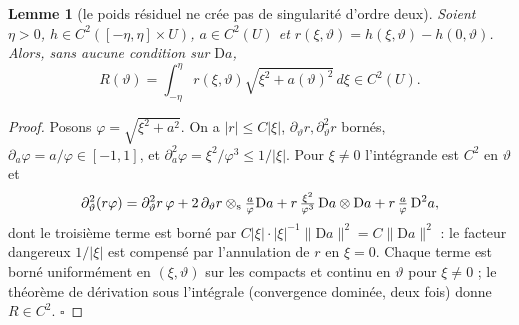 \documentclass[11pt,a4paper]{article}
\newtheorem{lemme}[theoreme]{Lemme}
\theoremstyle{remark}
\newcommand{\vth}{\vartheta}
\newcommand{\D}{\mathrm D}
\begin{document}
\begin{lemme}[le poids résiduel ne crée pas de singularité d'ordre deux]\label{lem:poids}
Soient $\eta>0$, $h\in C^2([-\eta,\eta]\times U)$, $a\in C^2(U)$ et $r(\xi,\vth)=h(\xi,\vth)-h(0,\vth)$. Alors, \emph{sans aucune condition sur $\D a$},
\[
R(\vth)=\int_{-\eta}^{\eta}r(\xi,\vth)\sqrt{\xi^2+a(\vth)^2}\,d\xi\in C^2(U).
\]
\end{lemme}
\begin{proof}
Posons $\varphi=\sqrt{\xi^2+a^2}$. On a $\lvert r\rvert\le C\lvert\xi\rvert$, $\partial_\vth r,\partial^2_\vth r$ bornés, $\partial_a\varphi=a/\varphi\in[-1,1]$, et $\partial_a^2\varphi=\xi^2/\varphi^3\le1/\lvert\xi\rvert$. Pour $\xi\ne0$ l'intégrande est $C^2$ en $\vth$ et
\[
\partial_\vth^2(r\varphi)=\partial^2_\vth r\,\varphi+2\,\partial_\vth r\otimes_{\rm s}\tfrac a\varphi\D a+r\,\tfrac{\xi^2}{\varphi^3}\,\D a\otimes\D a+r\,\tfrac a\varphi\,\D^2a ,
\]
dont le troisième terme est borné par $C\lvert\xi\rvert\cdot\lvert\xi\rvert^{-1}\lVert\D a\rVert^2=C\lVert\D a\rVert^2$ : le facteur dangereux $1/\lvert\xi\rvert$ est compensé par l'annulation de $r$ en $\xi=0$. Chaque terme est borné uniformément en $(\xi,\vth)$ sur les compacts et continu en $\vth$ pour $\xi\ne0$ ; le théorème de dérivation sous l'intégrale (convergence dominée, deux fois) donne $R\in C^2$. $\square$
\end{proof}
\end{document}
